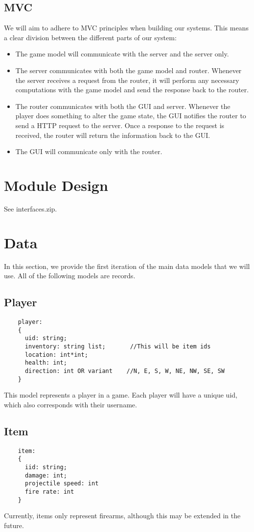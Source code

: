 \documentclass{article}
\begin{document}
	\subsection{MVC}
	We will aim to adhere to MVC principles when building our systems. This means a clear division between the different parts of our system:
	\begin{itemize}
		\item The game model will communicate with the server and the server only. 
		\item The server communicates with both the game model and router. Whenever the server receives a request from the router, it will perform any necessary computations with the game model and send the response back to the router.
		\item The router communicates with both the GUI and server. Whenever the player does something to alter the game state, the GUI notifies the router to send a HTTP request to the server. Once a response to the request is received, the router will return the information back to the GUI.
		\item The GUI will communicate only with the router. 
	\end{itemize}
	
    \section{Module Design}

        See interfaces.zip.

    \section{Data}
    	In this section, we provide the first iteration of the main data models that we will use. All of the following models are records. 
	
	\subsection{Player}
	\begin{verbatim}
	player:
	{
	  uid: string;
	  inventory: string list;    	//This will be item ids
	  location: int*int;
	  health: int;
	  direction: int OR variant    //N, E, S, W, NE, NW, SE, SW
	}	
	\end{verbatim}
	This model represents a player in a game. Each player will have a unique uid, which also corresponds with their username.
	
	\subsection{Item}
	\begin{verbatim}
	item: 
	{
	  iid: string;
	  damage: int;
	  projectile speed: int
	  fire rate: int
	}
	\end{verbatim}
	Currently, items only represent firearms, although this may be extended in the future.
	
\end{document}
